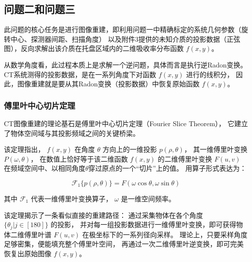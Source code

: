 \subsection{问题二和问题三}

此问题的核心任务是进行图像重建，即利用问题一中精确标定的系统几何参数（旋转中心、探测器间距、扫描角度）
以及附件3提供的未知介质的投影数据（正弦图），反向求解出该介质在托盘区域内的二维吸收率分布函数 $f(x,y)$。
\par
从数学角度看，此过程本质上是求解一个逆问题，具体而言是执行逆Radon变换。
CT系统测得的投影数据，是在一系列角度下对函数 $f(x,y)$ 进行的线积分，
因此，图像重建就是要从其Radon变换（投影数据）中恢复原始函数 $f(x,y)$。

\subsubsection{傅里叶中心切片定理}
CT图像重建的理论基石是傅里叶中心切片定理（Fourier Slice Theorem），
它建立了物体空间域与其投影频域之间的关键桥梁。
\par

该定理指出， $f(x,y)$ 在角度 $\theta$ 方向上的一维投影 $p(\rho,\theta)$，
其一维傅里叶变换$P(\omega,\theta)$，
在数值上恰好等于该二维函数 $f(x,y)$ 的二维傅里叶变换 $F(u,v)$ 
在频域空间中、以相同角度$\theta$穿过原点的一个“切片”上的值。
用算子形式表达为：

\begin{equation*}
    \mathcal{F}_1\{p(\rho,\theta)\}=F(\omega\cos\theta,\omega\sin\theta)
\end{equation*}

其中 $\mathcal{F}_1$  代表一维傅里叶变换算子， $\omega$ 是一维空间频率。\par

该定理揭示了一条看似直接的重建路径：
通过采集物体在各个角度 $\{\theta_j|j\in [180] \}$ 的投影，
并对每一组投影数据进行一维傅里叶变换，即可获得物体二维傅里叶谱 $F(u,v)$ 在极坐标下的一系列径向采样。
理论上，只要采样角度足够密集，便能填充整个傅里叶空间，
再通过一次二维傅里叶逆变换，即可完美恢复出原始图像 $f(x,y)$。\par

